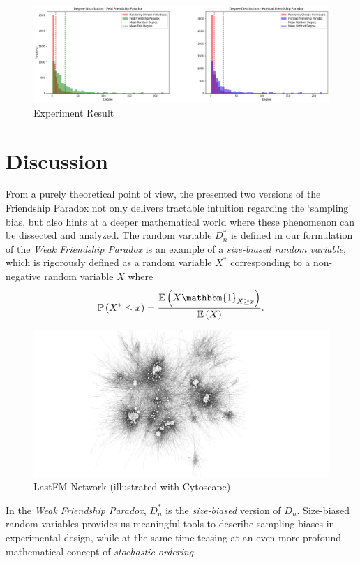 \documentclass[12pt,reqno, a4]{amsart}
\begin{document}
\begin{figure}[H]
  \centering  \includegraphics[width=\textwidth]{illustration/experiment_result.png}
  \caption{Experiment Result}
\end{figure}


\section{Discussion}
From a purely theoretical point of view, the presented two versions of the Friendship Paradox not only delivers tractable intuition regarding the `sampling' bias, but also hints at a deeper mathematical world where these phenomenon can be dissected and analyzed. The random variable $D_n^*$ is defined in our formulation of the \textit{Weak Friendship Paradox} is an example of a \textit{size-biased random variable}, which is rigorously defined as a random variable $X^*$ corresponding to a non-negative random variable $X$ where \[
\pr{X^* \leq x} = \frac{\E{X\mathbbm{1}_{X \geq x}}}{\E{X}}.
\]
\begin{figure}
  \centering  \includegraphics[width = 1.2\textwidth]{illustration/lastfm_network.png}
  \caption{LastFM Network (illustrated with Cytoscape)}
\end{figure}
In the \textit{Weak Friendship Paradox}, $D_n^*$ is the \textit{size-biased} version of $D_n$. Size-biased random variables provides us meaningful tools to describe sampling biases in experimental design, while at the same time teasing at an even more profound mathematical concept of \textit{stochastic ordering}.
\end{document}
